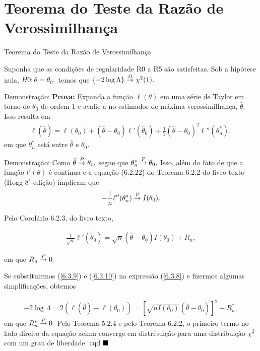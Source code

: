 \documentclass[12pt]{beamer}
\begin{document}
\section{Teorema do Teste da Razão de Verossimilhança}
\begin{frame}{Teorema do Teste da Razão de Verossimilhança}
\begin{Teorema}
\justifying
Suponha que as condições de regularidade R0 a R5 são satisfeitas. Sob a hipótese nula, $H0: \theta = \theta_0,$ temos que $\{-2 \log \Lambda\} \overset{D}{\rightarrow} \chi^2(1).$
\end{Teorema}
\pause
\begin{block}{Demonstração:}
\justifying
\textbf{Prova:} Expanda a função $\ell(\theta)$ em uma série de Taylor em torno de $\theta_0$ de ordem 1 e avalie-a no estimador de máxima verossimilhança, $\hat{\theta}$. Isso resulta em
\begin{align}\label{6.3.8}
    \ell(\hat{\theta}) = \ell(\theta_{0}) + (\hat{\theta} - \theta_0)\ell'(\hat{\theta}_{0}) + \frac{1}{2}(\hat{\theta} - \theta_0)^2 \ell''(\theta^{*}_{n}),
\end{align}
em que $\theta^*_n$ está entre $\hat{\theta}$ e $\theta_0.$
\end{block}
\end{frame}


\begin{frame}{}
\begin{block}{Demonstração:}
\justifying
Como $\hat{\theta} \overset{P}{\rightarrow} \theta_0,$ segue que $\theta^*_n \overset{P}{\rightarrow} \theta_0.$ Isso, além do fato de que a função $l'(\theta)$ é contínua e a equação (6.2.22) do Teorema 6.2.2 do livro texto (Hogg $8^{\circ}$ edição) implicam que
\begin{align}\label{6.3.9}
    -\frac{1}{n}\ell''(\theta^{*}_{n}) \overset{P}{\rightarrow} I(\theta_0).
\end{align}

Pelo Corolário 6.2.3, do livro texto,

\begin{align}\label{6.3.10}
   \frac{1}{\sqrt{n}}\ell'(\hat{\theta}_{0}) = \sqrt{n}(\hat{\theta} - \theta_0)I(\theta_0) + R_n, 
\end{align}

em que $R_n \overset{P}{\rightarrow} 0.$ 

\end{block}
\end{frame}

\begin{frame}{}
\begin{block}{}
\justifying
Se substituirmos (\ref{6.3.9}) e (\ref{6.3.10}) na expressão (\ref{6.3.8}) e fizermos algumas simplificações, obtemos

\begin{align*}
    -2 \log \Lambda = 2(\ell(\hat{\theta}) - \ell(\theta_{0})) = \left[\sqrt{nI(\theta_0)}(\hat{\theta} - \theta_0)\right]^2 + R^*_n,
\end{align*}
em que $R^*_n \overset{P}{\rightarrow} 0.$ Pelo Teorema 5.2.4 e pelo Teorema 6.2.2, o primeiro termo no lado direito da equação acima converge em distribuição para uma distribuição $\chi^2$ com um grau de liberdade. $\text{cqd}~\blacksquare$
\end{block}
\end{frame}
\end{document}
